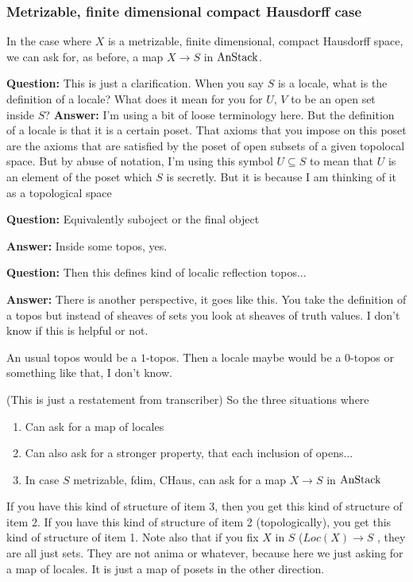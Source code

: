 \subsubsection{Metrizable, finite dimensional compact Hausdorff case} \label{subsubsec:metrizable_etc_case}
In the case where $X$ is a metrizable, finite dimensional, compact Hausdorff space, we can ask for, as before, a map $X \to S$ in $\text{AnStack}$.

\textbf{Question:} This is just a clarification. When you say $S$ is a locale, what is the definition of a locale? What does it mean for you for $U$, $V$ to be an open set inside $S$?
\textbf{Answer:} I'm using a bit of loose terminology here. But the definition of a locale is that it is a certain poset. That axioms that you impose on this poset are the axioms that are satisfied by the poset of open subsets of a given topolocal space.
But by abuse of notation, I'm using this symbol $U \subseteq S$ to mean that $U$ is an element of the poset which $S$ is secretly. But it is because I am thinking of it as a topological space 


\textbf{Question:} Equivalently suboject or the final object  

\textbf{Answer:} Inside some topos, yes. 

\textbf{Question:} Then this defines kind of localic reflection topos...


\textbf{Answer:} There is another perspective, it goes like this. You take the definition of a topos but instead of sheaves of sets you look at sheaves of truth values. I don't know if this is helpful or not.

An usual topos would be a $1$-topos. Then a locale maybe would be a $0$-topos or something like that, I don't know.

(This is just a restatement from transcriber)
So the three situations where
\begin{enumerate}
\item Can ask for a map of locales
\item Can also ask for a stronger property, that each inclusion of opens...
\item In case $S$ metrizable, fdim, CHaus, can ask for a map $X \to S$ in $\text{AnStack}$
\end{enumerate}


If you have this kind of structure of item 3, then you get this kind of structure of item 2. If you have this kind of structure of item 2 (topologically), you get this kind of structure  of item 1.
Note also that if you fix $X$ in $S$ ($Loc(X) \to S$ ,  they are all just sets. They are not anima or whatever, because here we just asking for a map of locales. It is just a map of posets in the other direction. 

